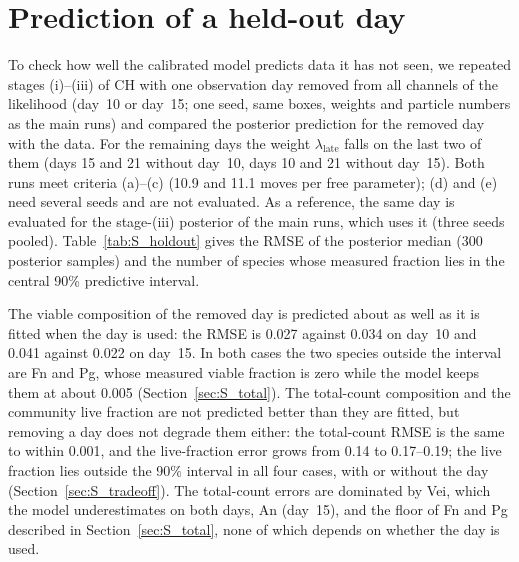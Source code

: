 \documentclass[11pt,a4paper]{article}
\newcommand{\suppdir}{figures/raw/supp}%
\begin{document}
\begin{table}[p]
\centering\small

\caption{Cost of each inference stage (median over the three seeds): particle number $N_p$, mutation steps per tempering step $n_{\mathrm{mut}}$, number of tempering steps $K$, wall time per seed on one GPU, and number of likelihood evaluations $N_{\mathrm{lik}}=N_p(1+\sum n_{\mathrm{mut}})$. DH: stage (iii) is the final stage; stage (iv) is listed for completeness. Generated by \texttt{tools/make\_cost\_table.py}.}
\label{tab:stagecost}
\end{table}

\section{Prediction of a held-out day}
\label{sec:S_holdout}
To check how well the calibrated model predicts data it has not seen, we repeated stages (i)--(iii) of CH with one observation day removed from all channels of the likelihood (day~10 or day~15; one seed, same boxes, weights and particle numbers as the main runs) and compared the posterior prediction for the removed day with the data.
For the remaining days the weight $\lambda_{\mathrm{late}}$ falls on the last two of them (days 15 and 21 without day~10, days 10 and 21 without day~15).
Both runs meet criteria (a)--(c) (10.9 and 11.1 moves per free parameter); (d) and (e) need several seeds and are not evaluated.
As a reference, the same day is evaluated for the stage-(iii) posterior of the main runs, which uses it (three seeds pooled).
Table~\ref{tab:S_holdout} gives the RMSE of the posterior median (300 posterior samples) and the number of species whose measured fraction lies in the central 90\% predictive interval.

The viable composition of the removed day is predicted about as well as it is fitted when the day is used: the RMSE is 0.027 against 0.034 on day~10 and 0.041 against 0.022 on day~15.
In both cases the two species outside the interval are Fn and Pg, whose measured viable fraction is zero while the model keeps them at about 0.005 (Section~\ref{sec:S_total}).
The total-count composition and the community live fraction are not predicted better than they are fitted, but removing a day does not degrade them either: the total-count RMSE is the same to within 0.001, and the live-fraction error grows from 0.14 to 0.17--0.19; the live fraction lies outside the 90\% interval in all four cases, with or without the day (Section~\ref{sec:S_tradeoff}).
The total-count errors are dominated by Vei, which the model underestimates on both days, An (day~15), and the floor of Fn and Pg described in Section~\ref{sec:S_total}, none of which depends on whether the day is used.
\end{document}
